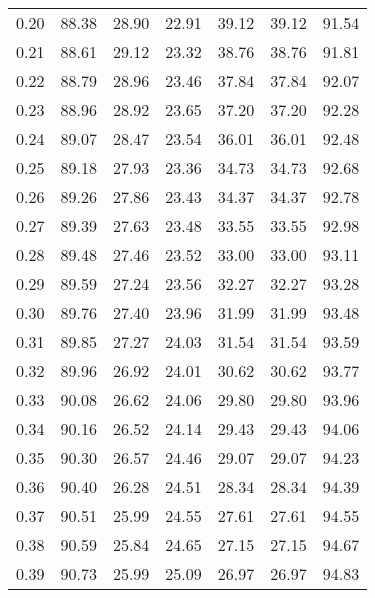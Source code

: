 \begin{tabular}{|c|c|c|c|c|c|c|}
      0.20 &     88.38 &     28.90 &      22.91 &   39.12 &      39.12 &         91.54 \\
      0.21 &     88.61 &     29.12 &      23.32 &   38.76 &      38.76 &         91.81 \\
      0.22 &     88.79 &     28.96 &      23.46 &   37.84 &      37.84 &         92.07 \\
      0.23 &     88.96 &     28.92 &      23.65 &   37.20 &      37.20 &         92.28 \\
      0.24 &     89.07 &     28.47 &      23.54 &   36.01 &      36.01 &         92.48 \\
      0.25 &     89.18 &     27.93 &      23.36 &   34.73 &      34.73 &         92.68 \\
      0.26 &     89.26 &     27.86 &      23.43 &   34.37 &      34.37 &         92.78 \\
      0.27 &     89.39 &     27.63 &      23.48 &   33.55 &      33.55 &         92.98 \\
      0.28 &     89.48 &     27.46 &      23.52 &   33.00 &      33.00 &         93.11 \\
      0.29 &     89.59 &     27.24 &      23.56 &   32.27 &      32.27 &         93.28 \\
      0.30 &     89.76 &     27.40 &      23.96 &   31.99 &      31.99 &         93.48 \\
      0.31 &     89.85 &     27.27 &      24.03 &   31.54 &      31.54 &         93.59 \\
      0.32 &     89.96 &     26.92 &      24.01 &   30.62 &      30.62 &         93.77 \\
      0.33 &     90.08 &     26.62 &      24.06 &   29.80 &      29.80 &         93.96 \\
      0.34 &     90.16 &     26.52 &      24.14 &   29.43 &      29.43 &         94.06 \\
      0.35 &     90.30 &     26.57 &      24.46 &   29.07 &      29.07 &         94.23 \\
      0.36 &     90.40 &     26.28 &      24.51 &   28.34 &      28.34 &         94.39 \\
      0.37 &     90.51 &     25.99 &      24.55 &   27.61 &      27.61 &         94.55 \\
      0.38 &     90.59 &     25.84 &      24.65 &   27.15 &      27.15 &         94.67 \\
      0.39 &     90.73 &     25.99 &      25.09 &   26.97 &      26.97 &         94.83 \\

\end{tabular}
